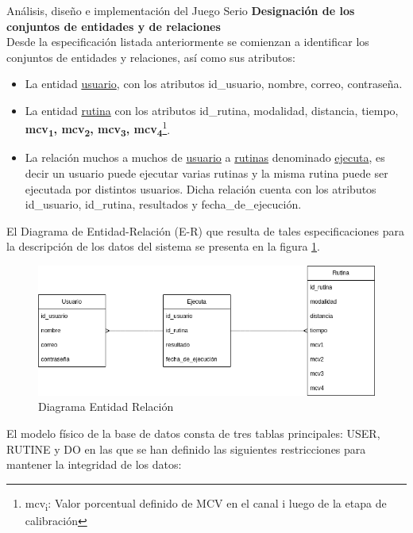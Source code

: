 \begin{thesischapter}{2} {Análisis, diseño e implementación del Juego Serio}
    \vspace{10pt}
    \textbf{Designación de los conjuntos de entidades y de relaciones}\\
    Desde la especificación listada anteriormente se comienzan a
    identificar los conjuntos de entidades y relaciones, así como sus atributos:
    \begin{itemize}
        \item La entidad \underline{usuario}, con los atributos id\_usuario, nombre, correo, contraseña.
        \item La entidad \underline{rutina} con los atributos id\_rutina, modalidad, distancia, tiempo, \textbf{mcv\textsubscript{1}, mcv\textsubscript{2}, mcv\textsubscript{3}, mcv\textsubscript{4}}\footnote{mcv\textsubscript{i}: Valor porcentual definido de MCV en el canal i luego de la etapa de calibración}.
        \item La relación muchos a muchos de \underline{usuario} a \underline{rutinas} denominado \underline{ejecuta}, es decir un usuario puede ejecutar 
        varias rutinas y la misma rutina puede ser ejecutada por distintos usuarios. Dicha relación cuenta con los atributos id\_usuario, id\_rutina, resultados y fecha\_de\_ejecución. 
    \end{itemize}
    
    \vspace{10pt}
    El Diagrama de Entidad-Relación (E-R) que resulta de tales especificaciones para la descripción de los datos del sistema se presenta en la figura \ref{fig: diagram-er}.
    \begin{figure}[ht]
        \centering
        \includegraphics[scale=0.45]{images/diagram-er.png}
        \caption{Diagrama Entidad Relación}
        \label{fig: diagram-er}
    \end{figure}

    El modelo físico de la base de datos consta de tres tablas principales: USER, RUTINE y DO en las que se han definido las siguientes 
    restricciones para mantener la integridad de los datos:


\end{thesischapter}
